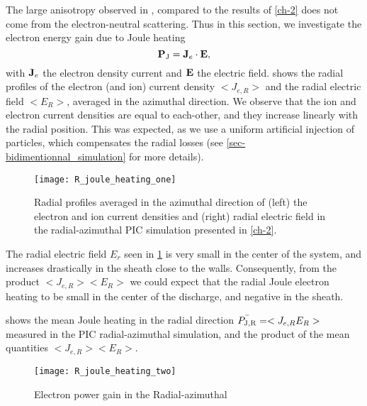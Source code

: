   The large anisotropy observed in , compared to the results of \cref{ch-2} does not come from the electron-neutral scattering.
  Thus in this section, we investigate the electron energy gain due to Joule heating
  \begin{equation} \label{eq-epower}
      {\mathbf P_{\rm J}} = {\mathbf J_e} \cdot {\mathbf E},
  \end{equation}
  with ${\mathbf J_e}$ the electron density current and ${\mathbf E}$ the electric field.
   shows the radial profiles of the electron (and ion) current density $< J_{e, R}>$ and the radial electric field $ < E_R >$, averaged in the azimuthal direction.
  We observe that the ion and electron current densities are equal to each-other, and they increase linearly with the radial position.
  This was expected, as we use a uniform artificial injection of particles, which compensates the radial losses (see \cref{sec-bidimentionnal_simulation} for more details).

  \begin{figure}[hbt]
    \centering
    \texttt{[image: R\_joule\_heating\_one]}
    \caption{Radial profiles averaged in the azimuthal direction of (left) the electron and ion current densities and (right) radial electric field in the radial-azimuthal \ac{PIC} simulation presented in \cref{ch-2}. }
    \label{fig-epower_radialone}
  \end{figure}
  
  The radial electric field $E_r$ seen in \cref{fig-epower_radialone} is very small in the center of the system, and increases drastically in the sheath close to the walls.
  Consequently, from the product $< J_{e, R}>  < E_R >$ we could expect that the radial Joule electron heating to be small in the center of the discharge, and negative in the sheath.

   shows the mean Joule heating in the radial direction $\bar{P_{\rm J, R}} = < J_{e, R} E_R >$ measured in the \ac{PIC} radial-azimuthal simulation, and the product of the mean quantities $< J_{e, R}>  < E_R >$.

  \begin{figure}[hbt]
    \centering
    \texttt{[image: R\_joule\_heating\_two]}
    \caption{Electron power gain in the Radial-azimuthal }
    \label{fig-epower_radial}
  \end{figure}

